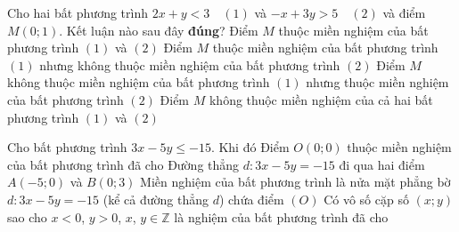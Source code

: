 \begin{ex}
	Cho hai bất phương trình $2x+y<3\quad (1)$ và $-x+3y>5\quad (2)$ và điểm $M(0;1)$. Kết luận nào sau đây \textbf{đúng}?
	\choice
	{Điểm $M$ thuộc miền nghiệm của bất phương trình $(1)$ và $(2)$}
	{\True Điểm $M$ thuộc miền nghiệm của bất phương trình $(1)$ nhưng không thuộc miền nghiệm của bất phương trình $(2)$}
	{Điểm $M$ không thuộc miền nghiệm của bất phương trình $(1)$ nhưng thuộc miền nghiệm của bất phương trình $(2)$}
	{Điểm $M$ không thuộc miền nghiệm của cả hai bất phương trình $(1)$ và $(2)$}
\end{ex}

\begin{ex}
	Cho bất phương trình $3 x-5 y\le-15$. Khi đó
	\choiceTF
	{Điểm $O(0;0)$ thuộc miền nghiệm của bất phương trình đã cho}
	{\True Đường thẳng $d\colon 3x -5y =-15$ đi qua hai điểm $A(-5; 0)$ và $B(0; 3)$}
	{Miền nghiệm của bất phương trình là nửa mặt phẳng bờ $d\colon 3x -5y =-15$ (kể cả đường thẳng $d$) chứa điểm $(O)$}
	{\True Có vô số cặp số $(x; y)$ sao cho $x<0$, $y>0$, $x$, $y\in \mathbb{Z}$ là nghiệm của bất phương trình đã cho}
\end{ex}

